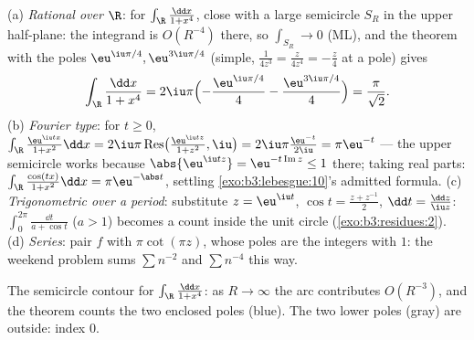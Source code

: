 \begin{example}
\label{ex:b3:residues:integrals}
(a) \emph{Rational over $\R$}: for $\int_\R\frac{\dd x}{1 +
x^4}$, close with a large semicircle $S_R$ in the upper
half-plane: the integrand is $O(R^{-4})$ there, so
$\int_{S_R} \to 0$ (ML), and the  theorem with the
poles $\eu^{\iu\pi/4}, \eu^{3\iu\pi/4}$ (simple, 
$\frac1{4z^3} = \frac{z}{4z^4} = -\frac z4$ at a pole) gives
\[
\int_\R\frac{\dd x}{1 + x^4}
= 2\iu\pi\Bigl(-\frac{\eu^{\iu\pi/4}}4 -
\frac{\eu^{3\iu\pi/4}}4\Bigr)
= \frac{\pi}{\sqrt2} .
\]
(b) \emph{Fourier type}: for $t \geq 0$,
$\int_\R\frac{\eu^{\iu tx}}{1 + x^2}\dd x =
2\iu\pi\operatorname{Res}\bigl(\tfrac{\eu^{\iu tz}}{1+z^2},
\iu\bigr) = 2\iu\pi\frac{\eu^{-t}}{2\iu} = \pi\eu^{-t}$ ---
the upper semicircle works because $\abs{\eu^{\iu tz}} =
\eu^{-t\operatorname{Im}z} \leq 1$ there; taking real parts:
$\int_\R\frac{\cos(tx)}{1+x^2}\dd x = \pi\eu^{-\abs t}$,
settling \cref{exo:b3:lebesgue:10}'s admitted formula.
(c) \emph{Trigonometric over a period}: substitute $z =
\eu^{\iu t}$, $\cos t = \frac{z + z^{-1}}2$, $\dd t =
\frac{\dd z}{\iu z}$: $\int_0^{2\pi}\frac{\dd t}{a + \cos t}$
($a > 1$) becomes a  count inside the unit circle
(\cref{exo:b3:residues:2}).
(d) \emph{Series}: pair $f$ with $\pi\cot(\pi z)$, whose poles
are the integers with  $1$: the weekend problem sums
$\sum n^{-2}$ and $\sum n^{-4}$ this way.
\end{example}

\begin{omfigure}

{\small The semicircle contour for $\int_\R\frac{\dd x}{1 +
x^4}$: as $R \to \infty$ the arc contributes $O(R^{-3})$, and
the  theorem counts the two enclosed poles (blue). The
two lower poles (gray) are outside: index $0$.}
\end{omfigure}

